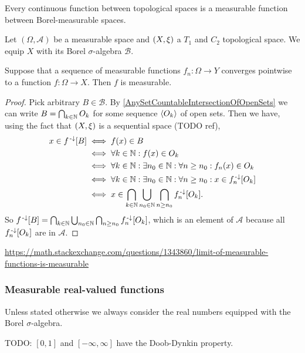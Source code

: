 \begin{lemma}
Every continuous function between topological spaces is a measurable function between Borel-measurable spaces.
\end{lemma}

\begin{proposition} \label{pointWiseConvergenceMeasurable}
Let $(\Omega,\mathcal{A})$ be a measurable space and $\sSet{X,\xi}$ a $T_1$ and $C_2$ topological space. We equip $X$ with its Borel $\sigma$-algebra $\mathcal{B}$.

Suppose that a sequence of measurable functions $f_n : \Omega \to Y$ converges pointwise to a function $f:\Omega\to X$. Then $f$ is measurable.
\end{proposition}
\begin{proof}
Pick arbitrary $B\in \mathcal{B}$. By \ref{AnySetCountableIntersectionOfOpenSets} we can write $B = \bigcap_{k\in\mathbb{N}}O_k$ for some sequence $\left\langle O_k \right\rangle$ of open sets. Then we have, using the fact that $\sSet{X,\xi}$ is a sequential space (TODO ref),
\begin{align*}
x\in f^{{\text{\hspace{0.15em}-}\downarrow}}[B] &\iff f(x)\in B \\
&\iff \forall k\in\mathbb{N}: f(x)\in O_k\\
&\iff \forall k\in\mathbb{N}: \exists n_0\in\mathbb{N}: \forall n\geq n_0: f_n(x)\in O_k \\
&\iff \forall k\in\mathbb{N}: \exists n_0\in\mathbb{N}: \forall n\geq n_0: x\in f^{{\text{\hspace{0.15em}-}\downarrow}}_n[O_k] \\
&\iff x\in \bigcap_{k\in\mathbb{N}}\bigcup_{n_0\in\mathbb{N}}\bigcap_{n\geq n_0}f^{{\text{\hspace{0.15em}-}\downarrow}}_n[O_k].
\end{align*}
So $f^{{\text{\hspace{0.15em}-}\downarrow}}[B] = \bigcap_{k\in\mathbb{N}}\bigcup_{n_0\in\mathbb{N}}\bigcap_{n\geq n_0}f^{{\text{\hspace{0.15em}-}\downarrow}}_n[O_k]$, which is an element of $\mathcal{A}$ because all $f^{{\text{\hspace{0.15em}-}\downarrow}}_n[O_k]$ are in $\mathcal{A}$.
\end{proof}

\url{https://math.stackexchange.com/questions/1343860/limit-of-measurable-functions-is-measurable}


\subsubsection{Measurable real-valued functions}
Unless stated otherwise we always consider the real numbers equipped with the Borel $\sigma$-algebra.

\begin{proposition}
TODO: $[0,1]$ and $[-\infty,\infty]$ have the Doob-Dynkin property.
\end{proposition}

